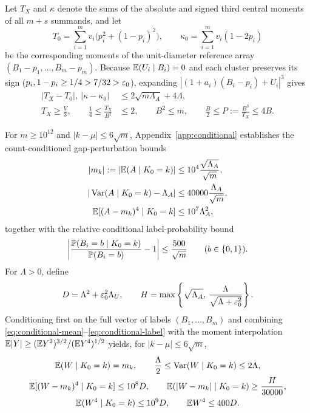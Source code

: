 Let $T_X$ and $\kappa$ denote the sums of the absolute and signed third
central moments of all $m+s$ summands, and let
\[
 T_0=\sum_{i=1}^m v_i\bigl(p_i^2+(1-p_i)^2\bigr),\qquad
 \kappa_0=\sum_{i=1}^m v_i(1-2p_i)
\]
be the corresponding moments of the unit-diameter reference array
$(B_1-p_1,\ldots,B_m-p_m)$. Because $\mathbb E(U_i\mid B_i)=0$ and each cluster preserves
its sign ($p_i,1-p_i\ge1/4>7/32>\varepsilon_0$), expanding $|(1+a_i)(B_i-p_i)+U_i|^3$
gives
\begin{align}
 |T_X-T_0|,\ |\kappa-\kappa_0|
      &\le2\sqrt{m\Lambda_A}+4\Lambda,                  \label{eq:moment-budget}\\
 T_X\ge \frac V3,\qquad\frac14\le \frac{T_X}{B^2}&\le2,\qquad
 B^2\le m,\qquad \frac B2\le P:=\frac{B^3}{T_X}\le4B.   \label{eq:prefactor}
\end{align}

For $m\ge10^{12}$ and $|k-\mu|\le6\sqrt m$, Appendix~\ref{app:conditional}
establishes the count-conditioned gap-perturbation bounds
\begin{align}
 |m_k|:=|\mathbb E(A\mid K_0=k)|&\le10^4\frac{\sqrt{\Lambda_A}}{\sqrt m},
                                                        \label{eq:conditional-mean}\\
 |\operatorname{Var}(A\mid K_0=k)-\Lambda_A|&\le40000\frac{\Lambda_A}{\sqrt m},\notag\\
 \mathbb E[(A-m_k)^4\mid K_0=k]&\le10^7\Lambda_A^2,             \label{eq:conditional-gap}
\end{align}
together with the relative conditional label-probability bound
\begin{equation}\label{eq:conditional-label}
 \left|\frac{\mathbb P(B_i=b\mid K_0=k)}{\mathbb P(B_i=b)}-1\right|
                         \le\frac{500}{\sqrt m}\qquad(b\in\{0,1\}).
\end{equation}
For $\Lambda>0$, define
\begin{equation}\label{eq:DH}
 D=\Lambda^2+\varepsilon_0^2\Lambda_U,\qquad
 H=\max\left\{\sqrt{\Lambda_A},\,
                   \frac\Lambda{\sqrt{\Lambda+\varepsilon_0^2}}\right\}.
\end{equation}
Conditioning first on the full vector of labels $(B_1,\ldots,B_m)$ and
combining \eqref{eq:conditional-mean}--\eqref{eq:conditional-label} with the
moment interpolation $\mathbb E|Y|\ge(\mathbb E Y^2)^{3/2}/(\mathbb E Y^4)^{1/2}$ yields, for
$|k-\mu|\le6\sqrt m$,
\begin{gather}
 \mathbb E(W\mid K_0=k)=m_k,\qquad
 \frac\Lambda2\le\operatorname{Var}(W\mid K_0=k)\le2\Lambda,\notag\\
 \mathbb E[(W-m_k)^4\mid K_0=k]\le10^8D,\qquad
 \mathbb E(|W-m_k|\mid K_0=k)\ge \frac{H}{30000},                       \label{eq:full-conditional}\\
 \mathbb E(W^4\mid K_0=k)\le10^9D,\qquad\mathbb E W^4\le400D.\notag
\end{gather}

